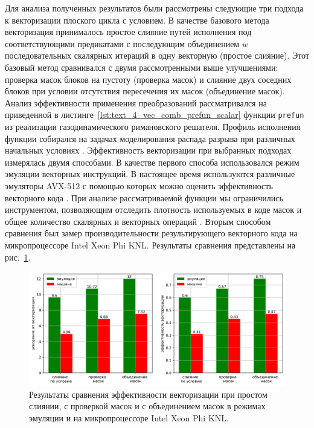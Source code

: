 Для анализа полученных результатов были рассмотрены следующие три подхода к векторизации плоского цикла с условием.
В качестве базового метода векторизация принималось простое слияние путей исполнения под соответствующими предикатами с последующим объединением $w$ последовательных скалярных итераций в одну векторную (простое слияние).
Этот базовый метод сравнивался с двумя рассмотренными выше улучшениями: проверка масок блоков на пустоту (проверка масок) и слияние двух соседних блоков при условии отсутствия пересечения их масок (объединение масок).
Анализ эффективности применения преобразований рассматривался на приведенной в листинге~\ref{lst:text_4_vec_comb_prefun_scalar} функции \texttt{prefun} из реализации газодинамического римановского решателя.
Профиль исполнения функции собирался на задачах моделирования распада разрыва при различных начальных условиях \cite{Toh2024VecRiemann,Zeng2021VecRiemann}.
Эффективность векторизации при выбранных подходах измерялась двумя способами.
В качестве первого способа использовался режим эмуляции векторных инструкций.
В настоящее время используются различные эмуляторы AVX-512 с помощью которых можно оценить эффективность векторного кода \cite{Lee2024VecGem}.
При анализе рассматриваемой функции мы ограничились инструментом, позволяющим отследить плотность используемых в коде масок и общее количество скалярных и векторных операций \cite{Rybakov2023VecShvindt}.
Вторым способом сравнения был замер производительности результирующего векторного кода на микропроцессоре Intel Xeon Phi KNL.
Результаты сравнения представлены на рис.~\ref{fig:text_4_vec_comb_mask_res}.

\begin{figure}[ht]
\centering
\includegraphics[width=1.0\textwidth]{./fig/vec_masks_union_res.png}
\singlespacing
{}\caption{Результаты сравнения эффективности векторизации при простом слиянии, с проверкой масок и с объединением масок в режимах эмуляции и на микропроцессоре Intel Xeon Phi KNL\label{abbr:knl-9}.}
\label{fig:text_4_vec_comb_mask_res}
\end{figure}


